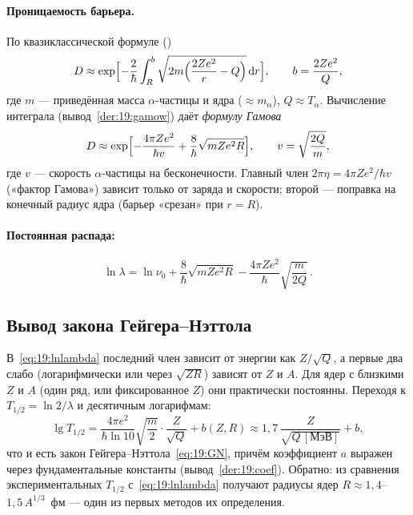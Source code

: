 \paragraph{Проницаемость барьера.} По квазиклассической формуле ()
\[
  D\approx\exp\Bigl[-\frac2\hbar\int_R^b\sqrt{2m\Bigl(\frac{2Ze^2}{r}-Q\Bigr)}\,\mathrm{d} r\Bigr],\qquad b=\frac{2Ze^2}{Q},
\]
где $m$ — приведённая масса $\alpha$-частицы и ядра ($\approx m_\alpha$), $Q\approx T_\alpha$. Вычисление интеграла
(вывод~\ref{der:19:gamow}) даёт \emph{формулу Гамова}
\begin{equation}\label{eq:19:Gamow}
  D\approx\exp\Bigl[-\frac{4\pi Ze^2}{\hbar v}+\frac{8}{\hbar}\sqrt{mZe^2R}\Bigr],\qquad v=\sqrt{\frac{2Q}{m}},
\end{equation}
где $v$ — скорость $\alpha$-частицы на бесконечности. Главный член $2\pi\eta=4\pi Ze^2/\hbar v$ («фактор Гамова») зависит только от
заряда и скорости; второй — поправка на конечный радиус ядра (барьер «срезан» при $r=R$).

\paragraph{Постоянная распада:}
\begin{equation}\label{eq:19:lnlambda}
  \ln\lambda=\ln\nu_0+\frac8\hbar\sqrt{mZe^2R}-\frac{4\pi Ze^2}{\hbar}\sqrt{\frac{m}{2Q}}\,.
\end{equation}

\subsection{Вывод закона Гейгера--Нэттола}

В~\eqref{eq:19:lnlambda} последний член зависит от энергии как $Z/\sqrt Q$, а первые два слабо (логарифмически или через $\sqrt{ZR}$)
зависят от $Z$ и $A$. Для ядер с близкими $Z$ и $A$ (один ряд, или фиксированное $Z$) они практически постоянны. Переходя к
$T_{1/2}=\ln2/\lambda$ и десятичным логарифмам:
\begin{equation}\label{eq:19:GNderived}
  \lg T_{1/2}=\frac{4\pi e^2}{\hbar\ln10}\sqrt{\frac m2}\cdot\frac{Z}{\sqrt Q}+b(Z,R)
  \approx1{,}7\,\frac{Z}{\sqrt{Q\,[\text{МэВ}]}}+b ,
\end{equation}
что и есть закон Гейгера--Нэттола~\eqref{eq:19:GN}, причём коэффициент $a$ выражен через фундаментальные константы
(вывод~\ref{der:19:coef}). Обратно: из сравнения экспериментальных $T_{1/2}$ с~\eqref{eq:19:lnlambda} получают радиусы ядер
$R\approx1{,}4$--$1{,}5\,A^{1/3}$~фм — один из первых методов их определения.

